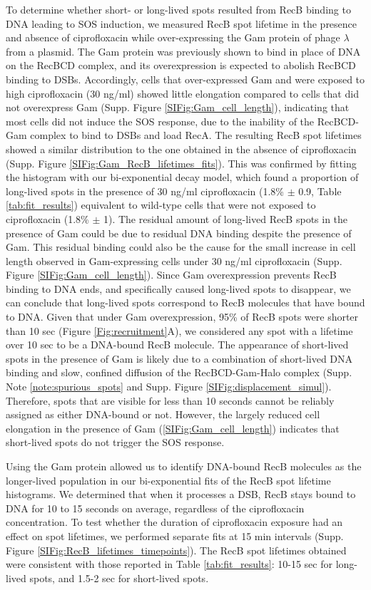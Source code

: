 To determine whether short- or long-lived spots resulted from RecB binding to DNA leading to SOS induction, we measured RecB spot lifetime in the presence and absence of ciprofloxacin while over-expressing the Gam protein of phage $\lambda$ from a plasmid. The Gam protein was previously shown to bind in place of DNA on the RecBCD complex\cite{Wilkinson2016}, and its overexpression is expected to abolish RecBCD binding to DSBs. Accordingly, cells that over-expressed Gam and were exposed to high ciprofloxacin (30 ng/ml) showed little elongation compared to cells that did not overexpress Gam (Supp. Figure \ref{SIFig:Gam_cell_length}), indicating that most cells did not induce the SOS response, due to the inability of the RecBCD-Gam complex to bind to DSBs and load RecA. The resulting RecB spot lifetimes showed a similar distribution to the one obtained in the absence of ciprofloxacin (Supp. Figure \ref{SIFig:Gam_RecB_lifetimes_fits}). This was confirmed by fitting the histogram with our bi-exponential decay model, which found a proportion of long-lived spots in the presence of 30 ng/ml ciprofloxacin (1.8\% $\pm$ 0.9, Table \ref{tab:fit_results}) equivalent to wild-type cells that were not exposed to ciprofloxacin (1.8\% $\pm$ 1). The residual amount of long-lived RecB spots in the presence of Gam could be due to residual DNA binding despite the presence of Gam. This residual binding could also be the cause for the small increase in cell length observed in Gam-expressing cells under 30 ng/ml ciprofloxacin (Supp. Figure \ref{SIFig:Gam_cell_length}). Since Gam overexpression prevents RecB binding to DNA ends, and specifically caused long-lived spots to disappear, we can conclude that long-lived spots correspond to RecB molecules that have bound to DNA. Given that under Gam overexpression, 95\% of RecB spots were shorter than 10 sec (Figure \ref{Fig:recruitment}A), we considered any spot with a lifetime over 10 sec to be a DNA-bound RecB molecule. The appearance of short-lived spots in the presence of Gam is likely due to a combination of short-lived DNA binding and slow, confined diffusion of the RecBCD-Gam-Halo complex (Supp. Note \ref{note:spurious_spots} and Supp. Figure \ref{SIFig:displacement_simul}). Therefore, spots that are visible for less than 10 seconds cannot be reliably assigned as either DNA-bound or not. However, the largely reduced cell elongation in the presence of Gam (\ref{SIFig:Gam_cell_length}) indicates that short-lived spots do not trigger the SOS response.

Using the Gam protein allowed us to identify DNA-bound RecB molecules as the longer-lived population in our bi-exponential fits of the RecB spot lifetime histograms. We determined that when it processes a DSB, RecB stays bound to DNA for 10 to 15 seconds on average, regardless of the ciprofloxacin concentration. To test whether the duration of ciprofloxacin exposure had an effect on spot lifetimes, we performed separate fits at 15 min intervals (Supp. Figure \ref{SIFig:RecB_lifetimes_timepoints}). The RecB spot lifetimes obtained were consistent with those reported in Table \ref{tab:fit_results}: 10-15 sec for long-lived spots, and 1.5-2 sec for short-lived spots.

